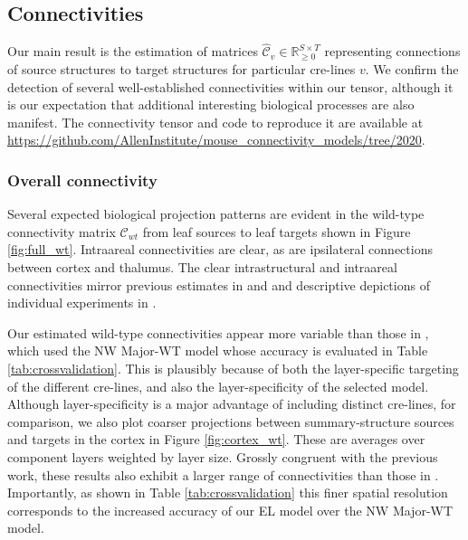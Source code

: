 \newpage

\subsection{Connectivities}

Our main result is the estimation of matrices $\hat {\mathcal C}_v \in \mathbb R_{\geq 0}^{S \times T}$ representing connections of source structures to target structures for particular cre-lines $v$. 
We confirm the detection of several well-established connectivities within our tensor, although it is our expectation that additional interesting biological processes are also manifest.
The connectivity tensor and code to reproduce it are available at \url{https://github.com/AllenInstitute/mouse_connectivity_models/tree/2020}.

\subsubsection{Overall connectivity}

Several expected biological projection patterns are evident in the wild-type connectivity matrix $\mathcal C_{wt}$ from leaf sources to leaf targets shown in Figure \ref{fig:full_wt}.
Intraareal connectivities are clear, as are ipsilateral connections between cortex and thalumus.
The clear intrastructural and intraareal connectivities mirror previous estimates in \citet{Oh2014-kh} and \citet{Knox2019-ot} and descriptive depictions of individual experiments in \citet{Harris2019-mr}.

Our estimated wild-type connectivities appear more variable than those in \citet{Knox2019-ot}, which used the NW Major-WT model whose accuracy is evaluated in Table \ref{tab:crossvalidation}.
This is plausibly because of both the layer-specific targeting of the different cre-lines, and also the layer-specificity of the selected model.
Although layer-specificity is a major advantage of including distinct cre-lines, for comparison, we also plot coarser projections between summary-structure sources and targets in the cortex in Figure \ref{fig:cortex_wt}.
These are averages over component layers weighted by layer size.
Grossly congruent with the previous work, these results also exhibit a larger range of connectivities than those in \citet{Knox2019-ot}.
Importantly, as shown in Table \ref{tab:crossvalidation} this finer spatial resolution corresponds to the increased accuracy of our EL model over the NW Major-WT model.

